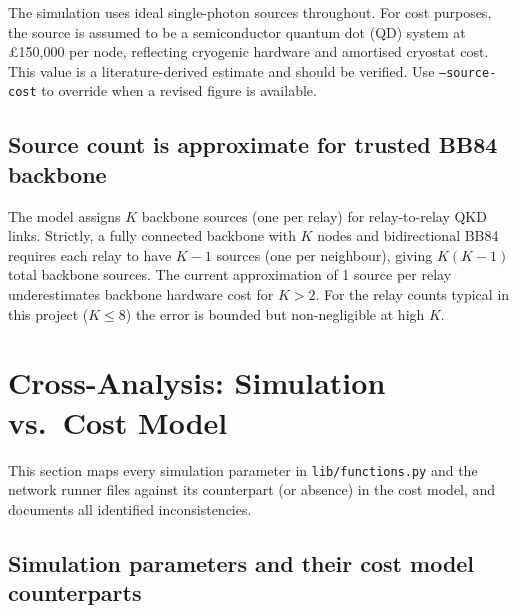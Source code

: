 \documentclass[12pt,a4paper]{article}
\begin{document}
The simulation uses ideal single-photon sources throughout. For cost purposes,
the source is assumed to be a semiconductor quantum dot (QD) system at
\pounds150{,}000 per node, reflecting cryogenic hardware and amortised cryostat
cost. This value is a literature-derived estimate and should be verified.
Use \texttt{--source-cost} to override when a revised figure is available.

\subsection{Source count is approximate for trusted BB84 backbone}

The model assigns $K$ backbone sources (one per relay) for relay-to-relay
QKD links. Strictly, a fully connected backbone with $K$ nodes and
bidirectional BB84 requires each relay to have $K{-}1$ sources (one per
neighbour), giving $K(K{-}1)$ total backbone sources. The current approximation
of 1 source per relay underestimates backbone hardware cost for $K > 2$.
For the relay counts typical in this project ($K \leq 8$) the error is
bounded but non-negligible at high $K$.

\section{Cross-Analysis: Simulation vs.\ Cost Model}

This section maps every simulation parameter in \texttt{lib/functions.py}
and the network runner files against its counterpart (or absence) in the cost
model, and documents all identified inconsistencies.

\subsection{Simulation parameters and their cost model counterparts}
\end{document}
